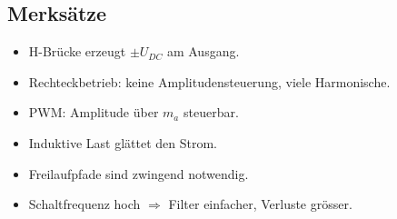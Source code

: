 \subsection{Merksätze}

\begin{itemize}
\item H-Brücke erzeugt $\pm U_{DC}$ am Ausgang.
\item Rechteckbetrieb: keine Amplitudensteuerung, viele Harmonische.
\item PWM: Amplitude über $m_a$ steuerbar.
\item Induktive Last glättet den Strom.
\item Freilaufpfade sind zwingend notwendig.
\item Schaltfrequenz hoch $\Rightarrow$ Filter einfacher, Verluste grösser.
\end{itemize}
